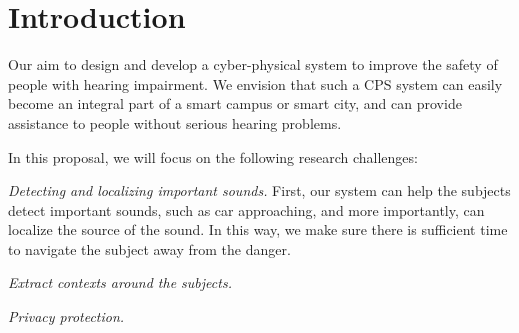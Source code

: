 \section{Introduction}\label{sec:intro}
Our aim to design and develop a cyber-physical system to improve the safety of people with hearing impairment.  We envision that such a CPS system can easily become an integral part of a smart campus or smart city, and can provide assistance to people without serious hearing problems.

In this proposal, we will focus on the following research challenges:
\begin{itemizer}
\item \emph{Detecting and localizing important sounds.} First, our system can help the subjects detect important sounds, such as car approaching, and more importantly, can localize the source of the sound. In this way, we make sure there is sufficient time to navigate the subject away from the danger. 
    
\item \emph{Extract contexts around the subjects.}
\item \emph{Privacy protection.}
\end{itemizer} 